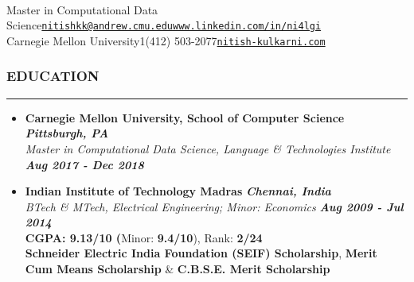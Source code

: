 \documentclass[10pt,a4paper,English]{article}
\newcommand\roottitle[1]{\vspace{-4mm}\subsubsection*{\uppercase{#1}}\vspace{-0.3em}\nopagebreak[4]\hrule\vspace{4mm}}
\newcommand\itemyear[1]{\hfill \textbf{\emph{\color{itemyear} #1}}}
\newcommand\itemenvnoindent{\setlength\itemsep{-1pt} \vspace{-1.5mm}}
\newcommand\hspacing{1mm}
\begin{document}
 \\
\vspace{-2mm}

\small

\noindent Master in Computational Data Science\hfill\href{mailto:nitishkk@andrew.cmu.edu}{\texttt{nitishkk\mbox{}@\mbox{}andrew.cmu.edu}}\hfill\href{https://www.linkedin.com/in/ni4lgi}{\texttt{www.linkedin.com/in/ni4lgi}}\\
\noindent Carnegie Mellon University\hfill\textsmaller{+}1(412) 503-2077\hfill\href{http://www.nitish-kulkarni.com}{\texttt{nitish-kulkarni.com}}\\
\vspace{2mm}

\roottitle{EDUCATION}
    \begin{itemize}[leftmargin=11pt] \itemenvnoindent
    
    \item \textbf{Carnegie Mellon University, School of Computer Science} \itemyear{Pittsburgh, PA}\\[\hspacing]
        \textit{Master in Computational Data Science, Language \& Technologies Institute} \itemyear{Aug 2017 - Dec 2018} \\[\hspacing]

    \vspace{-3mm}

    \item \textbf{Indian Institute of Technology Madras}  \itemyear{Chennai, India}\\[\hspacing]
        \textit{BTech \& MTech, Electrical Engineering; Minor: Economics} \itemyear{Aug 2009 - Jul 2014}\\[\hspacing]
        \textbf{CGPA: 9.13/10 (}Minor: \textbf{9.4/10}), Rank: \textbf{2/24} \\[\hspacing]
        \textbf{Schneider Electric India Foundation (SEIF) Scholarship},
        \textbf{Merit Cum Means Scholarship} \& \textbf{C.B.S.E. Merit Scholarship}
    \end{itemize}
\end{document}
